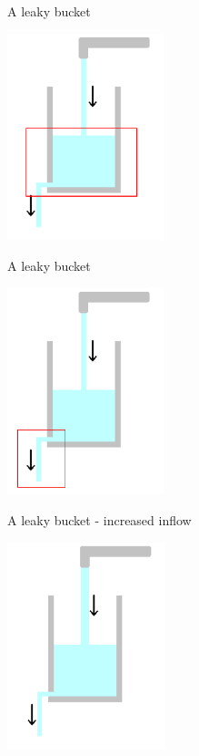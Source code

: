\documentclass{beamer}
\begin{document}
\begin{frame}{A leaky bucket}

  \begin{center}
    \includegraphics[height=6cm]{glass_contents.png}
  \end{center}
  
  
\end{frame}

\begin{frame}{A leaky bucket}

  \begin{center}
    \includegraphics[height=6cm]{glass_out.png}
  \end{center}
  
  
\end{frame}


\begin{frame}{A leaky bucket - increased inflow}

  \begin{center}
    \includegraphics[height=6cm]{glass_tap_up.png}
  \end{center}
  
  
\end{frame}
\end{document}
